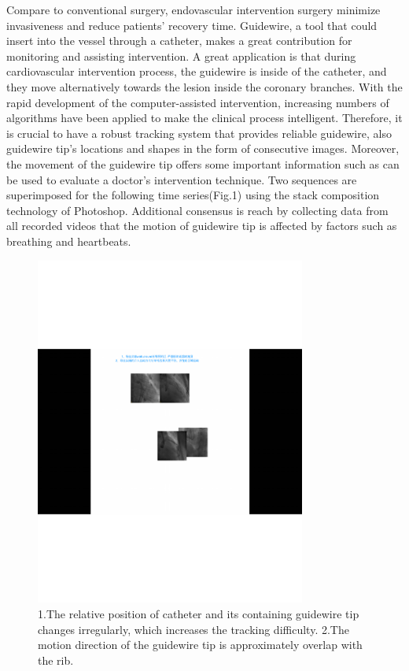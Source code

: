 \documentclass[letterpaper, 10 pt, conference]{ieeeconf}  %
\begin{document}
Compare to conventional surgery, endovascular intervention surgery minimize invasiveness and reduce patients' recovery time. Guidewire, a tool that could insert into the vessel through a catheter, makes a great contribution for monitoring and assisting intervention. A great application is that during cardiovascular intervention process, the guidewire is inside of the catheter, and they move alternatively towards the lesion inside the coronary branches. With the rapid development of the computer-assisted intervention, increasing numbers of algorithms have been applied to make the clinical process intelligent. Therefore, it is crucial to have a robust tracking system that provides reliable guidewire, also guidewire tip's locations and shapes in the form of consecutive images. Moreover, the movement of the guidewire tip offers some important information such as can be used to evaluate a doctor's intervention technique. Two sequences are superimposed for the following time series(Fig.1) using the stack composition technology of Photoshop. Additional consensus is reach by collecting data from all recorded videos that the motion of guidewire tip is affected by factors such as breathing and heartbeats.

\begin{figure}[thpb]
	\centering
	\includegraphics[width=3.5in]{figure1.eps}
		\caption{1.The relative position of catheter and its containing guidewire tip changes irregularly, which increases the tracking difficulty. 2.The motion direction of the guidewire tip is approximately overlap with the rib. } 
	\label{fig.mcmthesis-logo} 
\end{figure}
\end{document}
